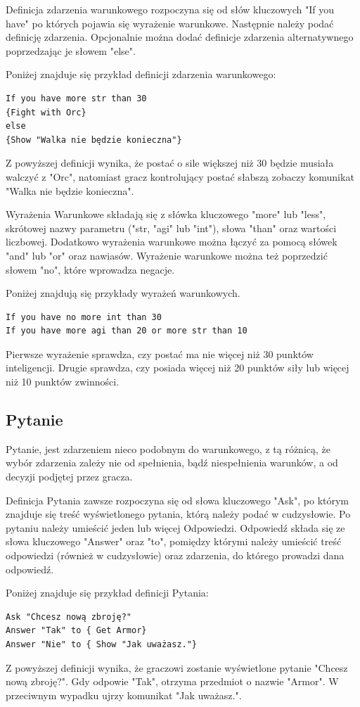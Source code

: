 \documentclass	{xmgr}
\begin{document}
Definicja zdarzenia warunkowego rozpoczyna się od słów kluczowych "If you have" po których pojawia się wyrażenie warunkowe.
Następnie należy podać definicję zdarzenia. Opcjonalnie można dodać definicje zdarzenia alternatywnego poprzedzając je słowem "else".

Poniżej znajduje się przykład definicji zdarzenia warunkowego: 
\begin{lstlisting}
If you have more str than 30 
{Fight with Orc}
else 
{Show "Walka nie będzie konieczna"}
\end{lstlisting}
Z powyższej definicji wynika, że postać o sile większej niż 30 będzie musiała walczyć z "Orc", natomiast gracz kontrolujący postać słabszą zobaczy komunikat "Walka nie będzie konieczna".

Wyrażenia Warunkowe składają się z słówka kluczowego "more" lub "less", skrótowej nazwy parametru ("str, "agi" lub "int"), słowa "than" oraz wartości liczbowej. Dodatkowo wyrażenia warunkowe można łączyć za pomocą słówek "and" lub "or" oraz nawiasów. Wyrażenie warunkowe można też poprzedzić słowem "no", które wprowadza negacje.

Poniżej znajdują się przykłady wyrażeń warunkowych.

\begin{lstlisting}
If you have no more int than 30
If you have more agi than 20 or more str than 10
\end{lstlisting}
Pierwsze wyrażenie sprawdza, czy postać ma nie więcej niż 30 punktów inteligencji. Drugie sprawdza, czy posiada więcej niż 20 punktów siły lub więcej niż 10 punktów zwinności.

\subsection*{Pytanie}
Pytanie, jest zdarzeniem nieco podobnym do warunkowego, z tą różnicą, że wybór zdarzenia zależy nie od spełnienia, bądź niespełnienia warunków, a od decyzji podjętej przez gracza.

Definicja Pytania zawsze rozpoczyna się od słowa kluczowego "Ask", po którym znajduje się treść wyświetlonego pytania, którą należy podać w cudzysłowie. Po pytaniu należy umieścić jeden lub więcej Odpowiedzi. Odpowiedź składa się ze słowa kluczowego "Answer" oraz "to", pomiędzy którymi należy umieścić treść odpowiedzi (również w cudzysłowie) oraz zdarzenia, do którego prowadzi dana odpowiedź. 

Poniżej znajduje się przykład definicji Pytania:
\begin{lstlisting}
Ask "Chcesz nową zbroję?"
Answer "Tak" to { Get Armor}
Answer "Nie" to { Show "Jak uważasz."}
\end{lstlisting}
Z powyższej definicji wynika, że graczowi zostanie wyświetlone pytanie "Chcesz nową zbroję?". Gdy odpowie "Tak", otrzyma przedmiot o nazwie "Armor". W przeciwnym wypadku ujrzy komunikat "Jak uważasz.".
\end{document}
